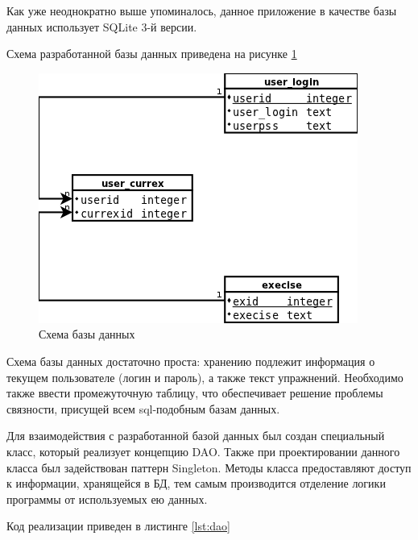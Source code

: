 Как уже неоднократно выше упоминалось, данное приложение в качестве базы данных использует SQLite 3-й версии.

Схема разработанной базы данных приведена на рисунке \ref{fig:db}

\begin{figure}[h!]
    \centering
    \includegraphics[scale=0.5]{images/db.png}
    \caption{Схема базы данных}
    \label{fig:db}
\end{figure}

Схема базы данных достаточно проста: хранению подлежит информация о текущем пользователе (логин и пароль), 
а также текст упражнений. Необходимо также ввести промежуточную таблицу, что обеспечивает решение проблемы 
связности, присущей всем sql-подобным базам данных.

Для взаимодействия с разработанной базой данных был создан специальный класс, который реализует концепцию DAO.
Также при проектировании данного класса был задействован паттерн Singleton. Методы класса предоставляют доступ
к информации, хранящейся в БД, тем самым производится отделение логики программы от используемых ею данных.

Код реализации приведен в листинге \ref{lst:dao}



